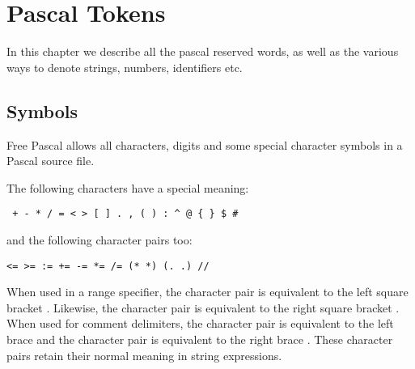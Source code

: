 
\chapter{Pascal Tokens}
In this chapter we describe all the pascal reserved words, as well as the
various ways to denote strings, numbers, identifiers etc.

\section{Symbols}
Free Pascal allows all characters, digits and some special character symbols
in a Pascal source file.

The following characters have a special meaning:
\begin{verbatim}
 + - * / = < > [ ] . , ( ) : ^ @ { } $ #
\end{verbatim}
and the following character pairs too:
\begin{verbatim}
<= >= := += -= *= /= (* *) (. .) //
\end{verbatim}
When used in a range specifier, the character pair  is equivalent to
the left square bracket \var{[}. Likewise, the character pair  is
equivalent to the right square bracket \var{]}.
When used for comment delimiters, the character pair \var{(*} is equivalent
to the  left brace \var{\{} and the character pair \var{*)} is equivalent
to the right brace \var{\}}.
These character pairs retain their normal meaning in string expressions.


